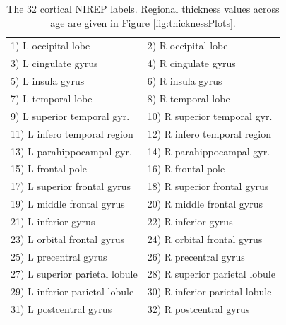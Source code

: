 
\begin{table}
\centering
\begin{tabular*}{0.45\textwidth}{@{\extracolsep{\fill}} l l}
\toprule
  1) L occipital lobe & 2) R occipital lobe \\
  3) L cingulate gyrus & 4) R cingulate gyrus \\
  5) L insula gyrus & 6) R insula gyrus \\
  7) L temporal lobe & 8) R temporal lobe \\
  9) L superior temporal gyr. & 10) R superior temporal gyr. \\
  11) L infero temporal region & 12) R infero temporal region \\
  13) L parahippocampal gyr. & 14) R parahippocampal gyr. \\
  15) L frontal pole & 16) R frontal pole \\
  17) L superior frontal gyrus & 18) R superior frontal gyrus \\
  19) L middle frontal gyrus & 20) R middle frontal gyrus \\
  21) L inferior gyrus & 22) R inferior gyrus \\
  23) L orbital frontal gyrus & 24) R orbital frontal gyrus \\
  25) L precentral gyrus & 26) R precentral gyrus \\
  27) L superior parietal lobule & 28) R superior parietal lobule \\
  29) L inferior parietal lobule & 30) R inferior parietal lobule \\
  31) L postcentral gyrus & 32)   R postcentral gyrus \\  
\bottomrule
\end{tabular*}
\caption{The 32 cortical NIREP labels.  Regional thickness values across 
age are given in Figure \ref{fig:thicknessPlots}.}
\label{table:nirep_labels}
\end{table}


